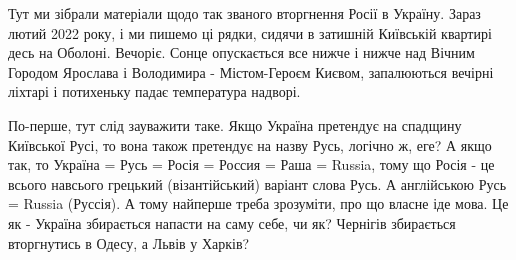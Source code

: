  
 
 
 
 

Тут ми зібрали матеріали щодо так званого вторгнення Росії в Україну. Зараз
лютий 2022 року, і ми пишемо ці рядки, сидячи в затишній Київській квартирі
десь на Оболоні. Вечоріє. Сонце опускається все нижче і нижче над Вічним
Городом Ярослава і Володимира - Містом-Героєм Києвом, запалюються вечірні
ліхтарі і потихеньку падає температура надворі.

По-перше, тут слід зауважити таке. Якщо Україна претендує на спадщину Київської
Русі, то вона також претендує на назву Русь, логічно ж, еге? А якщо так, то
Україна = Русь = Росія = Россия = Раша = Russia, тому що Росія - це всього
навсього грецький (візантійський) варіант слова Русь. А англійською Русь =
Russia (Руссія). А тому найперше треба зрозуміти, про що власне іде мова. Це як
- Україна збирається напасти на саму себе, чи як?  Чернігів збирається
вторгнутись в Одесу, а Львів у Харків?
